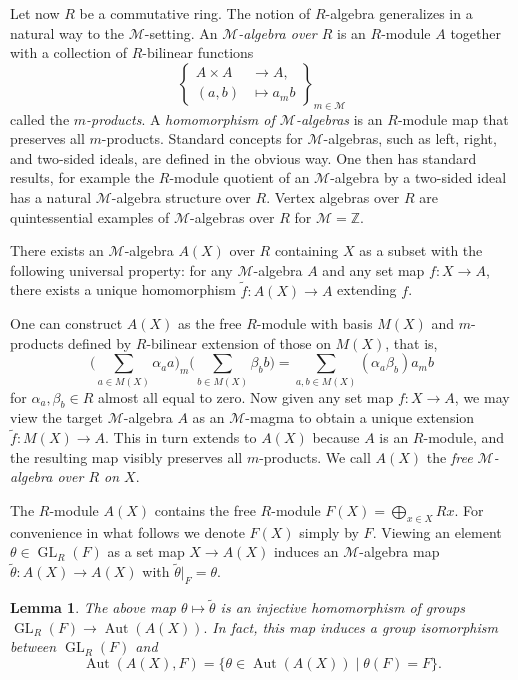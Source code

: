 \documentclass{article}
\newtheorem{lem}[thm]{Lemma}
\theoremstyle{definition}
\def\Aut{\ensuremath{\operatorname{Aut}}}
\def\GL{\ensuremath{\operatorname{GL}}}
\def\Mu{\ensuremath{\mathcal{M}}}
\begin{document}
Let now $R$ be a commutative ring. 
The notion of $R$-algebra generalizes in a natural way to the $\Mu$-setting.  An \emph{$\Mu$-algebra over $R$} is an $R$-module $A$ together with a collection of $R$-bilinear functions
\[ \left\{ \begin{aligned} A \times A &\to A, \\ (a,b) &\mapsto a_m b \end{aligned} \right\}_{m \in \Mu} \]
	called the {\it $m$-products}. A {\it homomorphism of $\Mu$-algebras} is an $R$-module map that preserves all $m$-products. Standard concepts for $\Mu$-algebras, such as  left, right, and two-sided ideals, are defined in the obvious way. One then has standard results, for example the $R$-module quotient of an $\Mu$-algebra by a two-sided ideal has a natural $\Mu$-algebra structure over $R$.
Vertex algebras over $R$ are quintessential examples of $\Mu$-algebras over $R$ for $\Mu = \mathbb Z$.

There exists an $\Mu$-algebra $A(X)$ over $R$ containing $X$ as a subset with the following universal property: for any $\Mu$-algebra $A$ and any set map $f \colon X \to A$, there exists a unique homomorphism $\widetilde f \colon A(X) \to A$ extending $f$.

One can construct $A(X)$ as the free $R$-module with basis $M(X)$ and $m$-products defined by $R$-bilinear extension of those on $M(X)$, that is, \[ \Bigg(\sum_{a \in M(X)} \alpha_a a\Bigg)_m \Bigg(\sum_{b \in M(X)} \beta_b b \Bigg) = \sum_{a, b \in M(X)} (\alpha_a \beta_b) a_m b\] for $\alpha_a, \beta_b \in R$ almost all equal to zero.
Now given any set map $f \colon X \to A$, we may view the target $\Mu$-algebra $A$ as an $\Mu$-magma to obtain a unique extension $\widetilde f\colon M(X) \to A$. This in turn extends to $A(X)$ because $A$ is an $R$-module, and the resulting map visibly preserves all $m$-products. We call $A(X)$ the {\it free $\Mu$-algebra over $R$ on $X.$}

The $R$-module $A(X)$ contains the free $R$-module $F(X) = \bigoplus_{x \in X} Rx$. For convenience in what follows we denote $F(X)$ simply by $F.$ Viewing an element $\theta \in \GL_R(F)$ as a set map $X \to A(X)$ induces an $\Mu$-algebra map $\widetilde \theta \colon A(X) \to A(X)$ with $\widetilde \theta |_{F} = \theta$.

\begin{lem}\label{Lemma1}
		The above map $ \theta \mapsto \widetilde \theta$ is an injective homomorphism of groups $ \GL_R(F) \to \Aut (A(X)).$ In fact, this map induces a group isomorphism between $\GL_R(F)$ and  \[ \Aut(A(X),F) = \{ \theta \in \Aut(A(X)) \mid \theta(F) = F\}.\] 	
\end{lem}
\end{document}
